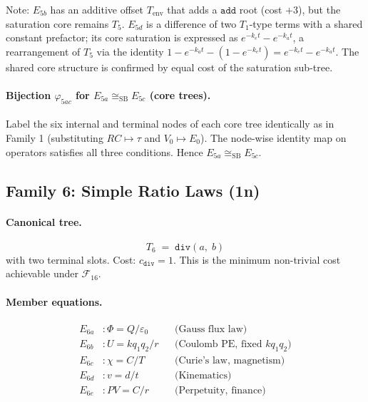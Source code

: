 \documentclass[12pt,a4paper]{article}
\theoremstyle{definition}
\newcommand{\mdiv}{\mathtt{div}}
\newcommand{\madd}{\mathtt{add}}
\newcommand{\siso}{\cong_{\mathrm{SB}}}
\begin{document}
Note: $E_{5b}$ has an additive offset $T_{\mathrm{env}}$ that adds a
$\madd$ root (cost $+3$), but the saturation core remains $T_5$.
$E_{5d}$ is a difference of two $T_1$-type terms with a shared constant
prefactor; its core saturation is expressed as $e^{-k_e t} - e^{-k_a t}$,
a rearrangement of $T_5$ via the identity
$1 - e^{-k_a t} - (1 - e^{-k_e t}) = e^{-k_e t} - e^{-k_a t}$.
The shared core structure is confirmed by equal cost of the saturation sub-tree.

\paragraph{Bijection $\varphi_{5ac}$ for $E_{5a} \siso E_{5c}$ (core trees).}
Label the six internal and terminal nodes of each core tree identically as in
Family 1 (substituting $RC \mapsto \tau$ and $V_0 \mapsto E_0$).  The node-wise
identity map on operators satisfies all three conditions.  Hence $E_{5a} \siso E_{5c}$.

\subsection{Family 6: Simple Ratio Laws (1n)}
\label{sec:fam6}

\paragraph{Canonical tree.}
\[
  T_6 \;=\; \mdiv(a,\; b)
\]
with two terminal slots.  Cost: $c_{\mdiv} = 1$.  This is the minimum
non-trivial cost achievable under $\mathcal{F}_{16}$.

\paragraph{Member equations.}
\begin{align*}
  E_{6a} &: \Phi = Q/\varepsilon_0       && \text{(Gauss flux law)} \\
  E_{6b} &: U = kq_1q_2/r               && \text{(Coulomb PE, fixed $kq_1q_2$)} \\
  E_{6c} &: \chi = C/T                  && \text{(Curie's law, magnetism)} \\
  E_{6d} &: v = d/t                     && \text{(Kinematics)} \\
  E_{6e} &: PV = C/r                    && \text{(Perpetuity, finance)}
\end{align*}
\end{document}
